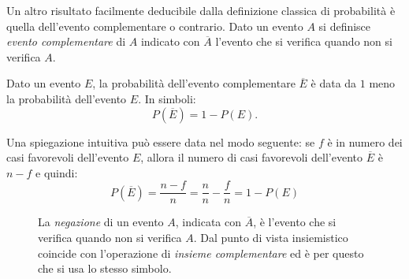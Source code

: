Un altro risultato facilmente deducibile dalla definizione classica di 
probabilità è quella dell'evento complementare o contrario.
Dato un evento $A$ si definisce \emph{evento complementare} di $A$ indicato 
con 
$\overline A$ l'evento che si verifica quando non si verifica $A$.







\begin{teorema}
Dato un evento $E$, la probabilità dell'evento complementare $\overline E$ è 
data da $1$ meno la probabilità dell'evento $E$. In simboli: \[ P(\overline 
E)=1-P(E). \]
\end{teorema}
Una spiegazione intuitiva può essere data nel modo seguente:
se $f$ è in numero dei casi favorevoli dell'evento $E$, allora il numero di 
casi favorevoli dell'evento $\overline 
E$ è $n-f$ e quindi:
$$ P(\overline 
E)= \dfrac{n-f}{n}=\dfrac{n}{n}-\dfrac{f}{n}=1-P(E)$$

\begin{inaccessibleblock}
 \begin{figure}[htpb]
\begin{minipage}[c]{.35\textwidth}
\end{minipage}\hfil
\begin{minipage}[c]{.55\textwidth}
La \emph{negazione} di un evento $A$, indicata con $\overline A$, è 
l'evento che si verifica quando non si verifica $A$. Dal punto di vista 
insiemistico coincide con l'operazione di \emph{insieme complementare} ed è 
per 
questo che si usa lo stesso simbolo.
\end{minipage}
\end{figure}
\end{inaccessibleblock}

